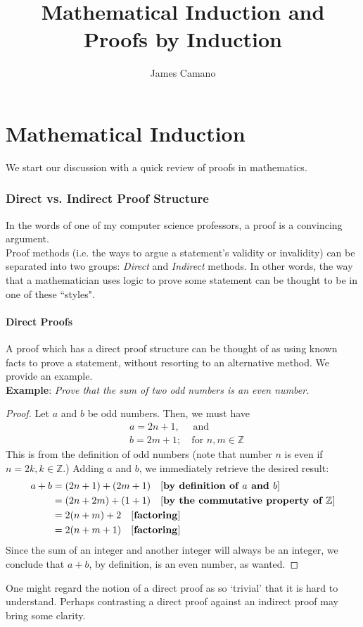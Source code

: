 \documentclass[10pt,a4paper,fleqn]{article}
\author{James Camano}
\title{Mathematical Induction and Proofs by Induction}
\newcommand{\example}[1]{\textbf{Example}: \emph{#1}}
\newcommand{\justification}[1]{\text{[\textbf{#1}]}}
\begin{document}
	\maketitle
	\newpage
	
	\part{Mathematical Induction}
		We start our discussion with a quick review of proofs in mathematics.
		\section{Direct vs. Indirect Proof Structure}
			In the words of one of my computer science professors, a proof is a convincing argument. \\ 
			Proof methods (i.e. the ways to argue a statement's validity or invalidity) can be separated into two groups: \emph{Direct} and \emph{Indirect} methods. In other words, the way that a mathematician uses logic to prove some statement can be thought to be in one of these ``styles".
			
		\subsection{Direct Proofs}
			A proof which has a direct proof structure can be thought of as using known facts to prove a statement, without resorting to an alternative method. We provide an example. \\
			
		\noindent \example{Prove that the sum of two odd numbers is an even number.}
		\begin{proof}
			Let $a$ and $b$ be odd numbers. Then, we must have
			\begin{align*}
				&a = 2n + 1, \quad \text{ and}   \\
				&b = 2m + 1; \quad \text{for } n,m \in \mathbb{Z}
			\end{align*}			
			This is from the definition of odd numbers (note that number $n$ is even if $n = 2k, k \in \mathbb{Z}$.) Adding $a$ and $b$, we immediately retrieve the desired result:
			\begin{align*}
				a + b &= (2n + 1) + (2m + 1) \quad \justification{by definition of $a$ and $b$} \\
						 &= (2n + 2m) + (1 + 1) \quad \justification{by the commutative property of $\mathbb{Z}$} \\
						 &= 2(n+m) + 2				\quad \justification{factoring} \\
						 &= 2(n+m+1)				\quad \justification{factoring}
			\end{align*}		
			Since the sum of an integer and another integer will always be an integer, we conclude that $a+b$, by definition, is an even number, as wanted.
		\end{proof}
	One might regard the notion of a direct proof as so `trivial' that it is hard to understand. Perhaps contrasting a direct proof against an indirect proof may bring some clarity.
	
\end{document}

